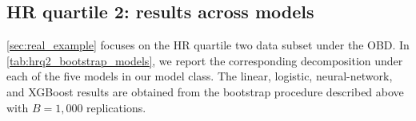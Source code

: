     
    
\subsection*{HR quartile 2: results across models}
\label{appendix:hrq2}

\cref{sec:real_example} focuses on the HR quartile two data subset under the OBD. In \cref{tab:hrq2_bootstrap_models}, we report the corresponding decomposition under each of the five models in our model class. The linear, logistic, neural-network, and XGBoost results are obtained from the bootstrap procedure described above with $B = 1{,}000$ replications.

